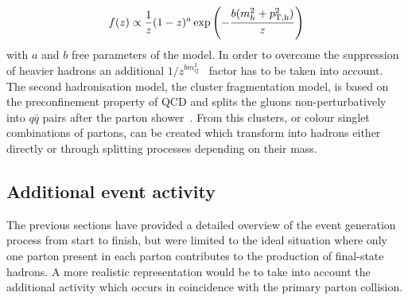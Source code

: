\begin{equation}
 f(z) \propto \frac{1}{z} (1-z)^{a} \exp \left( - \frac{b(m_{h}^{2} + p_{\rm T,h}^{2})}{z} \right)
\end{equation}
with $a$ and $b$ free parameters of the model.
In order to overcome the suppression of heavier hadrons an additional $1/z^{bm_{Q}^{2}}$~\cite{} factor has to be taken into account.
\\
The second hadronisation model, the cluster fragmentation model, is based on the preconfinement property of QCD and splits the gluons non-perturbatively into $q\bar{q}$ pairs after the parton shower~\cite{ClusterModel}. From this clusters, or colour singlet combinations of partons, can be created which transform into hadrons either directly or through splitting processes depending on their mass. 

\subsection{Additional event activity}%

The previous sections have provided a detailed overview of the event generation process from start to finish, but were limited to the ideal situation where only one parton present in each parton contributes to the production of final-state hadrons. A more realistic representation would be to take into account the additional activity which occurs in coincidence with the primary parton collision. 
\\

